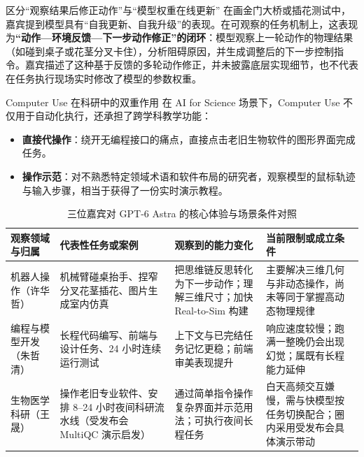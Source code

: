 \documentclass[UTF8,a4paper,11pt,fontset=fandol]{ctexart}
\begin{document}
\begin{warningbox}{区分“观察结果后修正动作”与“模型权重在线更新”}
在画金门大桥或插花测试中，嘉宾提到模型具有“自我更新、自我升级”的表现。在可观察的任务机制上，这表现为\textbf{“动作—环境反馈—下一步动作修正”的闭环}：模型观察上一轮动作的物理结果（如碰到桌子或花茎分叉卡住），分析阻碍原因，并生成调整后的下一步控制指令。嘉宾描述了这种基于反馈的多轮动作修正，并未披露底层实现细节，也不代表在任务执行现场实时修改了模型的参数权重。
\end{warningbox}
\begin{knowledgebox}{Computer Use 在科研中的双重作用}
在 AI for Science 场景下，Computer Use 不仅用于自动化执行，还承担了跨学科教学功能：
\begin{itemize}
\item \textbf{直接代操作}：绕开无编程接口的痛点，直接点击老旧生物软件的图形界面完成任务。
\item \textbf{操作示范}：对不熟悉特定领域术语和软件布局的研究者，观察模型的鼠标轨迹与输入步骤，相当于获得了一份实时演示教程。
\end{itemize}
\end{knowledgebox}
\begin{table}[H]\centering\small
\caption{三位嘉宾对 GPT-6 Astra 的核心体验与场景条件对照}
\begin{tabular}{>{\raggedright\arraybackslash}p{\dimexpr(\linewidth-8\tabcolsep)/4\relax}>{\raggedright\arraybackslash}p{\dimexpr(\linewidth-8\tabcolsep)/4\relax}>{\raggedright\arraybackslash}p{\dimexpr(\linewidth-8\tabcolsep)/4\relax}>{\raggedright\arraybackslash}p{\dimexpr(\linewidth-8\tabcolsep)/4\relax}}
\toprule
观察领域与归属 & 代表性任务或案例 & 观察到的能力变化 & 当前限制或成立条件\\\midrule
机器人操作（许华哲） & 机械臂碰桌抬手、捏窄分叉花茎插花、图片生成室内仿真 & 把思维链反思转化为下一步动作；理解三维尺寸；加快 Real-to-Sim 构建 & 主要解决三维几何与非动态操作，尚未等同于掌握高动态物理规律\\[4pt]
编程与模型开发（朱哲清） & 长程代码编写、前端与设计任务、24 小时连续运行测试 & 上下文与已完结任务记忆更稳；前端审美表现提升 & 响应速度较慢；跑满一整晚仍会出现幻觉；属既有长程能力延伸\\[4pt]
生物医学科研（王晟） & 操作老旧专业软件、安排 8–24 小时夜间科研流水线（受发布会 MultiQC 演示启发） & 通过简单指令操作复杂界面并示范用法；可执行夜间长程任务 & 白天高频交互嫌慢，需与快模型按任务切换配合；圈内采用受发布会具体演示带动\\[4pt]
\bottomrule\end{tabular}\end{table}
\end{document}

